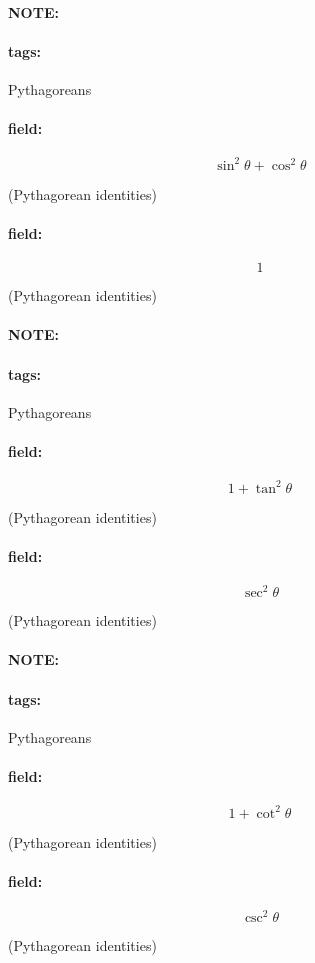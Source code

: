 \documentclass[12pt]{article}
\newenvironment{note}{\paragraph{NOTE:}}{}
\newenvironment{field}{\paragraph{field:}}{}
\newcommand*{\tags}[1]{\paragraph{tags: }#1}
\begin{document}
\begin{note}
    \tags{Pythagoreans}
    \begin{field}
    \[  
        \sin^2 \theta + \cos^2 \theta
    \] 
    \begin{center}
    (Pythagorean identities)
    \end{center}
    \end{field}
    \begin{field}
    \[
        1
    \] 
    \begin{center}
    (Pythagorean identities)
    \end{center}
    \end{field}
\end{note}


\begin{note}
    \tags{Pythagoreans}
    \begin{field}
    \[  
        1 + \tan^2 \theta
    \] 
    \begin{center}
    (Pythagorean identities)
    \end{center}
    \end{field}
    \begin{field}
    \[
        \sec^2 \theta
    \] 
    \begin{center}
    (Pythagorean identities)
    \end{center}
    \end{field}
\end{note}


\begin{note}
    \tags{Pythagoreans}
    \begin{field}
    \[  
        1 + \cot^2 \theta
    \] 
    \begin{center}
    (Pythagorean identities)
    \end{center}
    \end{field}
    \begin{field}
    \[
        \csc^2 \theta 
    \] 
    \begin{center}
    (Pythagorean identities)
    \end{center}
    \end{field}
\end{note}
\end{document}
